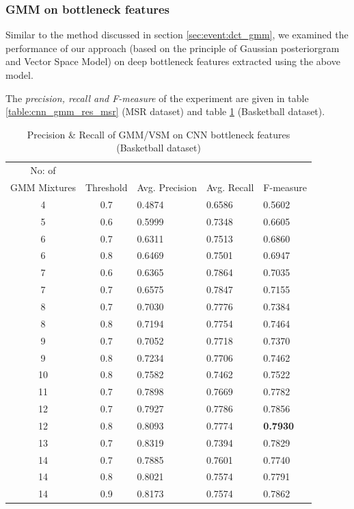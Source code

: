 \subsubsection{GMM on bottleneck features}
Similar to the method discussed in section \ref{sec:event:dct_gmm}, we examined the performance of our approach (based on the principle of Gaussian posteriorgram and Vector Space Model) on deep bottleneck features extracted using 	the above model. 

The \textit{precision, recall and F-measure} of the experiment are given in table \ref{table:cnn_gmm_res_msr} (MSR dataset) and table \ref{table:cnn_gmm_res_basket} (Basketball dataset).

\begin{table}[ht]
\caption[Event spotting using GMM/VSM on CNN(Gray,Frame diff,Edge) bottleneck features (MSR Action Dataset) ]{ Precision \& Recall  of GMM/VSM on CNN bottleneck features (Basketball dataset)}
\label{table:cnn_gmm_res_basket}
\centering
\begin{tabular}{|c|c|l|l|l|}
\hline
No: of &&&&\\
GMM Mixtures & Threshold & Avg. Precision & Avg. Recall & F-measure\\
\hline
\hline
4 	&0.7 	&0.4874 	& 0.6586	&0.5602\\
5 	&0.6 	&0.5999 	& 0.7348	&0.6605\\
6 	&0.7 	&0.6311 	& 0.7513	&0.6860\\
6 	&0.8 	&0.6469 	& 0.7501	&0.6947\\
7 	&0.6 	&0.6365 	& 0.7864	&0.7035\\
7 	&0.7 	&0.6575 	& 0.7847	&0.7155\\
8 	&0.7 	&0.7030 	& 0.7776	&0.7384\\
8 	&0.8 	&0.7194 	& 0.7754	&0.7464\\
9 	&0.7 	&0.7052 	& 0.7718	&0.7370\\
9 	&0.8 	&0.7234 	& 0.7706	&0.7462\\
10 	&0.8 	&0.7582 	& 0.7462	&0.7522\\
11 	&0.7 	&0.7898 	& 0.7669	&0.7782\\
12 	&0.7 	&0.7927 	& 0.7786	&0.7856\\
12 	&0.8 	&0.8093 	& 0.7774	&\textbf{0.7930}\\
13 	&0.7 	&0.8319 	& 0.7394	&0.7829\\
14 	&0.7 	&0.7885 	& 0.7601	&0.7740\\
14 	&0.8 	&0.8021 	& 0.7574	&0.7791\\
14 	&0.9 	&0.8173 	& 0.7574	&0.7862\\
\hline  
\end{tabular}
\end{table}
\pagebreak
